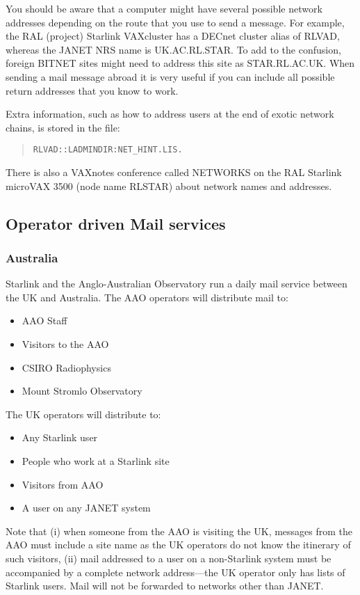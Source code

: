 You should be aware that a computer might have several possible network
addresses depending on the route that you use to send a message. For example,
the RAL (project) Starlink VAXcluster has a DECnet cluster alias of RLVAD,
whereas the JANET NRS name is UK.AC.RL.STAR. To add to the confusion, foreign
BITNET sites might need to address this site as STAR.RL.AC.UK. When sending a
mail message abroad it is very useful if you can include all possible return
addresses that you know to work.

Extra information, such as how to address users at the end of exotic network
chains, is stored in the file:
\begin{quote}
{\tt RLVAD::LADMINDIR:NET\_HINT.LIS.}
\end{quote}
There is also a VAXnotes conference called NETWORKS on the RAL Starlink
microVAX 3500
(node name RLSTAR) about network names and addresses.

\subsection{Operator driven Mail services}
\subsubsection{Australia}
\label{oper-mail}

Starlink and the Anglo-Australian Observatory run a daily mail service between
the UK and Australia.
The AAO operators will distribute mail to:
\begin{itemize}
\begin{itemize}
\item AAO Staff
\item Visitors to the AAO
\item CSIRO Radiophysics
\item Mount Stromlo Observatory
\end{itemize}
\end{itemize}
The UK operators will distribute to:
\begin{itemize}
\begin{itemize}
\item Any Starlink user
\item People who work at a Starlink site
\item Visitors from AAO
\item A user on any JANET system
\end{itemize}
\end{itemize}
Note that (i) when someone from the AAO is visiting the UK, messages from
the AAO must include a site name as the UK
operators do not know the itinerary of such visitors, (ii) mail addressed to a
user on a non-Starlink system must be accompanied by a complete network
address---the UK operator only has lists of Starlink users.
Mail will not be forwarded to networks other than JANET.

